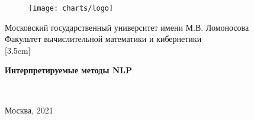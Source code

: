 \begin{center}
    \begin{figure}[h]
        \centering
        \texttt{[image: charts/logo]}
    \end{figure}
    
    \normalsize Московский государственный университет имени М.В. Ломоносова\\
    Факультет вычислительной математики и кибернетики\\
    [3.5cm] 
    
    \large \textbf{Интерпретируемые методы NLP} \\[2.6cm] %
    
    \end{center} 
    
    \begin{flushright}
    
    \\
    \end{flushright}
    
    \hfill \break
    \vfill 
    
    \begin{center} 
    \normalsize{Москва, 2021}\\
    \end{center} 
    
    \thispagestyle{empty}